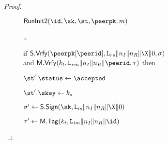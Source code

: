 \begin{proof}
\begin{collectinmacro}{\SIGMIProofSignatureMAC}{}{}
\begin{figure}[tp]
\begin{minipage}[t]{0.49\textwidth}
		\begin{oracle}{$\RunInit(\id,\sk,\st,\peerpk,m)$}
			\item \dots
			\item if $\SIGScheme.\SIGVerify(\peerpk[\peerid], \labelrs\|\nonce_I\|\nonce_R\|\X\|\Y, \sigma)$\\
				and $\MACScheme.\MACVerify(\kt, \labelrm\|\nonce_I\|\nonce_R\|\peerid, \tau)$ then
			\item \hindent {}\newline
				\null \hindent\hindent {}
			\item \hindent \hindent \gamechange{$\bad[S] \gets \true$} 
			\skipline
			\item[]
			\skipline
			\item \hindent $\st'.\status \gets \accepted$
			\item \hindent $\st'.\skey \gets \ks$
			\item \hindent $\sigma' \gets \SIGScheme.\SIGSign(\sk, \labelis\|\nonce_I\|\nonce_R\|\X\|\Y)$
			\item \hindent {}
			\item \hindent $\tau' \gets \MACScheme.\MACTag(\kt, \labelim\|\nonce_I\|\nonce_R\|\id)$

\end{oracle}
\end{minipage}
\end{figure}
\end{collectinmacro}
\end{proof}
